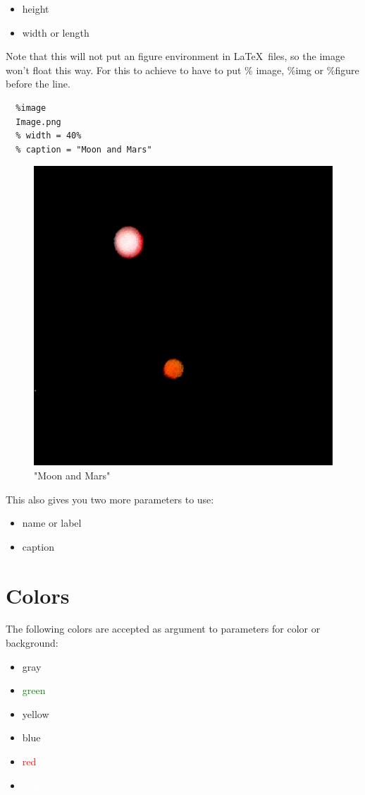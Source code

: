 \documentclass{article}
\begin{document}
\begin{itemize}
\item height
\item width or length
\end{itemize}


{Note that this will not put an figure environment in \LaTeX\ 
files, so the image won't float this way. For this to
achieve to have to put \% image, \%img or \%figure before the
line.\\}

\begin{verbatim}
  %image
  Image.png
  % width = 40%
  % caption = "Moon and Mars"
\end{verbatim}


\begin{figure}[hbt]
\includegraphics[width=.40\linewidth]{Image.png}
\caption{"Moon and Mars"}
\end{figure}


{This also gives you two more parameters to use:\\}

\begin{itemize}
\item name or label
\item caption
\end{itemize}


\section{Colors}

{The following colors are accepted as argument to parameters
for color or background:\\}

\colorbox{gray!75}{\parbox{\linewidth}{%
\begin{itemize}
\item gray
\item \textcolor{green}{green}
\item \textcolor{LightYellow1}{yellow}
\item \textcolor{PaleTurquoise1}{blue}
\item \textcolor{red}{red}
\item \textcolor{white}{white}
\end{itemize}

}
}
\end{document}
